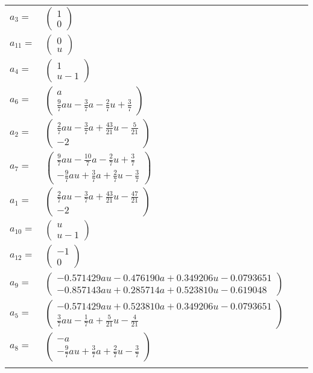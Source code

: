 \documentclass[1p]{elsarticle_modified}
\theoremstyle{definition}
\begin{document}
\begin{tabular}{m{7pt} m{180pt} m{7pt} m{180pt} }
\flushright $a_{3}=$&$\begin{pmatrix}1\\0\end{pmatrix}$ \\
\flushright $a_{11}=$&$\begin{pmatrix}0\\u\end{pmatrix}$ \\
\flushright $a_{4}=$&$\begin{pmatrix}1\\u-1\end{pmatrix}$ \\
\flushright $a_{6}=$&$\begin{pmatrix}a\\\frac{9}{7} a u-\frac{3}{7} a-\frac{2}{7} u+\frac{3}{7}\end{pmatrix}$ \\
\flushright $a_{2}=$&$\begin{pmatrix}\frac{2}{7} a u-\frac{3}{7} a+\frac{43}{21} u-\frac{5}{21}\\-2\end{pmatrix}$ \\
\flushright $a_{7}=$&$\begin{pmatrix}\frac{9}{7} a u-\frac{10}{7} a-\frac{2}{7} u+\frac{3}{7}\\-\frac{9}{7} a u+\frac{3}{7} a+\frac{2}{7} u-\frac{3}{7}\end{pmatrix}$ \\
\flushright $a_{1}=$&$\begin{pmatrix}\frac{2}{7} a u-\frac{3}{7} a+\frac{43}{21} u-\frac{47}{21}\\-2\end{pmatrix}$ \\
\flushright $a_{10}=$&$\begin{pmatrix}u\\u-1\end{pmatrix}$ \\
\flushright $a_{12}=$&$\begin{pmatrix}-1\\0\end{pmatrix}$ \\
\flushright $a_{9}=$&$\begin{pmatrix}-0.571429 a u-0.476190 a+0.349206 u-0.0793651\\-0.857143 a u+0.285714 a+0.523810 u-0.619048\end{pmatrix}$ \\
\flushright $a_{5}=$&$\begin{pmatrix}-0.571429 a u+0.523810 a+0.349206 u-0.0793651\\\frac{3}{7} a u-\frac{1}{7} a+\frac{5}{21} u-\frac{4}{21}\end{pmatrix}$ \\
\flushright $a_{8}=$&$\begin{pmatrix}- a\\-\frac{9}{7} a u+\frac{3}{7} a+\frac{2}{7} u-\frac{3}{7}\end{pmatrix}$\\&\end{tabular}
\end{document}

